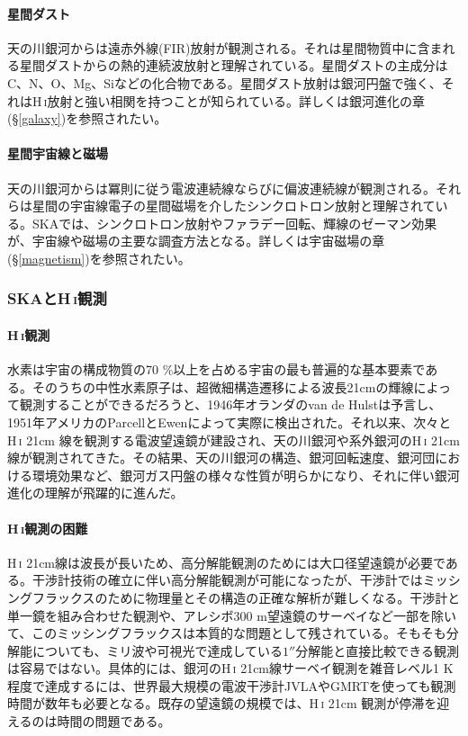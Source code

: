 \paragraph{星間ダスト}

天の川銀河からは遠赤外線(FIR)放射が観測される。それは星間物質中に含まれる星間ダストからの熱的連続波放射と理解されている。星間ダストの主成分はC、N、O、Mg、Siなどの化合物である。星間ダスト放射は銀河円盤で強く、それはH\,\textsc{i}放射と強い相関を持つことが知られている。詳しくは銀河進化の章(\S \ref{galaxy})を参照されたい。

\paragraph{星間宇宙線と磁場}

天の川銀河からは冪則に従う電波連続線ならびに偏波連続線が観測される。それらは星間の宇宙線電子の星間磁場を介したシンクロトロン放射と理解されている。SKAでは、シンクロトロン放射やファラデー回転、輝線のゼーマン効果が、宇宙線や磁場の主要な調査方法となる。詳しくは宇宙磁場の章(\S \ref{magnetism})を参照されたい。


\subsubsection{SKAとH\,\textsc{i}観測}
\label{c08.s1.ss1.sss2}

\paragraph{H\,\textsc{i}観測}

水素は宇宙の構成物質の70 \%以上を占める宇宙の最も普遍的な基本要素である。そのうちの中性水素原子は、超微細構造遷移による波長21cmの輝線によって観測することができるだろうと、1946年オランダのvan de Hulstは予言し、1951年アメリカのParcellとEwenによって実際に検出された。それ以来、次々とH\,\textsc{i} 21cm 線を観測する電波望遠鏡が建設され、天の川銀河や系外銀河のH\,\textsc{i} 21cm線が観測されてきた。その結果、天の川銀河の構造、銀河回転速度、銀河団における環境効果など、銀河ガス円盤の様々な性質が明らかになり、それに伴い銀河進化の理解が飛躍的に進んだ。

\paragraph{H\,\textsc{i}観測の困難}

H\,\textsc{i} 21cm線は波長が長いため、高分解能観測のためには大口径望遠鏡が必要である。干渉計技術の確立に伴い高分解能観測が可能になったが、干渉計ではミッシングフラックスのために物理量とその構造の正確な解析が難しくなる。干渉計と単一鏡を組み合わせた観測や、アレシボ300 m望遠鏡のサーベイなど一部を除いて、このミッシングフラックスは本質的な問題として残されている。そもそも分解能についても、ミリ波や可視光で達成している$1''$分解能と直接比較できる観測は容易ではない。具体的には、銀河のH\,\textsc{i} 21cm線サーベイ観測を雑音レベル1 K程度で達成するには、世界最大規模の電波干渉計JVLAやGMRTを使っても観測時間が数年も必要となる。既存の望遠鏡の規模では、H\,\textsc{i} 21cm 観測が停滞を迎えるのは時間の問題である。

